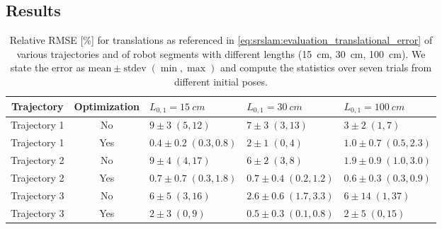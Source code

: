 \subsection{Results}\label{sub:srslam:simulation_results}
\begin{table}\small
\centering
\caption{Relative \gls{RMSE} [\%] for translations as referenced in \eqref{eq:srslam:evaluation_translational_error} of various trajectories and of robot segments with different lengths (\SI{15}{cm}, \SI{30}{cm}, \SI{100}{cm}). We state the error as $\text{mean} \pm \text{stdev} \; (\min, \max)$ and compute the statistics over seven trials from different initial poses.}
\begin{tabular}{cclll}\toprule
\textbf{Trajectory} & \textbf{Optimization} & $L_{0,1} = \SI{15}{cm}$ & $L_{0,1} = \SI{30}{cm}$ & $L_{0,1} = \SI{100}{cm}$\\
\midrule
Trajectory 1 & No & $9 \pm 3 \; (5, 12)$ & $7 \pm 3 \; (3, 13)$ & $3 \pm 2 \; (1, 7)$ \\
Trajectory 1 & Yes & $0.4 \pm 0.2 \; (0.3, 0.8)$ & $2 \pm 1 \; (0, 4)$ & $1.0 \pm 0.7 \; (0.5, 2.3)$ \\
\midrule
Trajectory 2 & No & $9 \pm 4 \; (4, 17)$ & $6 \pm 2 \; (3, 8)$ & $1.9 \pm 0.9 \; (1.0, 3.0)$ \\
Trajectory 2 & Yes & $0.7 \pm 0.7 \; (0.3, 1.8)$ & $0.7 \pm 0.4 \; (0.2, 1.2)$ & $0.6 \pm 0.3 \; (0.3, 0.9)$ \\
\midrule
Trajectory 3 & No & $6 \pm 5 \; (3, 16)$ & $2.6 \pm 0.6 \; (1.7, 3.3)$ & $6 \pm 14 \; (1, 37)$ \\
Trajectory 3 & Yes & $2 \pm 3 \; (0, 9)$ & $0.5 \pm 0.3 \; (0.1, 0.8)$ & $2 \pm 5 \; (0, 15)$ \\
\bottomrule
\end{tabular}
\label{tab:srslam:results_simulations_translation}
\end{table}

